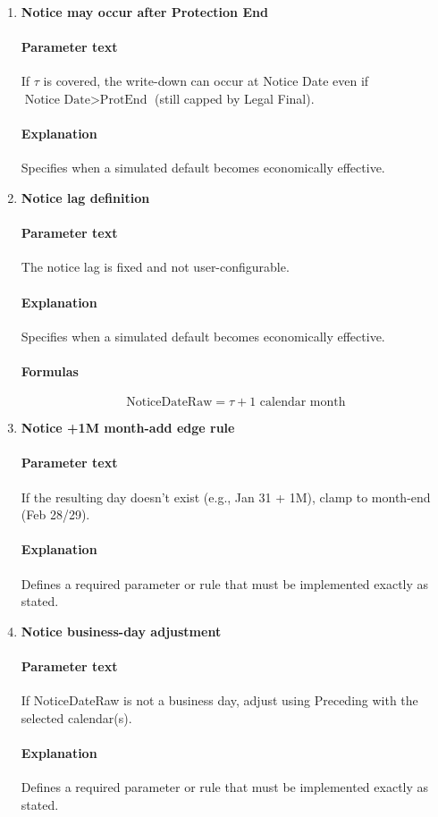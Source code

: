 \documentclass[11pt]{article}
\begin{document}
\begin{enumerate}[label=\arabic*),leftmargin=*,align=left]
\item \textbf{Notice may occur after Protection End}
\paragraph{Parameter text} If $\tau$ is covered, the write-down can occur at Notice Date even if $\text{Notice Date} > \text{ProtEnd}$ (still capped by Legal Final).
\paragraph{Explanation} Specifies when a simulated default becomes economically effective.

\item \textbf{Notice lag definition}
\paragraph{Parameter text} The notice lag is fixed and not user-configurable.
\paragraph{Explanation} Specifies when a simulated default becomes economically effective.
\paragraph{Formulas} 
\[ \text{NoticeDateRaw} = \tau + 1 \text{ calendar month} \]

\item \textbf{Notice +1M month-add edge rule}
\paragraph{Parameter text} If the resulting day doesn’t exist (e.g., Jan 31 + 1M), clamp to month-end (Feb 28/29).
\paragraph{Explanation} Defines a required parameter or rule that must be implemented exactly as stated.

\item \textbf{Notice business-day adjustment}
\paragraph{Parameter text} If NoticeDateRaw is not a business day, adjust using Preceding with the selected calendar(s).
\paragraph{Explanation} Defines a required parameter or rule that must be implemented exactly as stated.


\end{enumerate}
\end{document}
